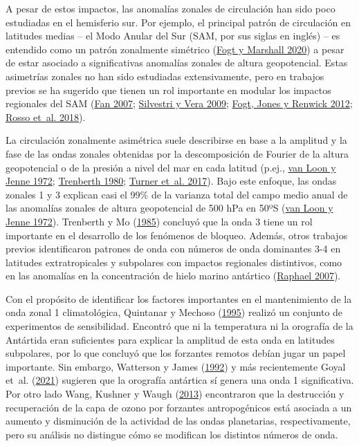 \documentclass[12pt,oneside,a4paper]{reedthesis}
\begin{document}
A pesar de estos impactos, las anomalías zonales de circulación han sido poco estudiadas en el hemisferio sur.
Por ejemplo, el principal patrón de circulación en latitudes medias -- el Modo Anular del Sur (SAM, por sus siglas en inglés) -- es entendido como un patrón zonalmente simétrico (\protect\hyperlink{ref-fogt2020}{Fogt y Marshall 2020}) a pesar de estar asociado a significativas anomalías zonales de altura geopotencial.
Estas asimetrías zonales no han sido estudiadas extensivamente, pero en trabajos previos se ha sugerido que tienen un rol importante en modular los impactos regionales del SAM (\protect\hyperlink{ref-fan2007}{Fan 2007}; \protect\hyperlink{ref-silvestri2009}{Silvestri y Vera 2009}; \protect\hyperlink{ref-fogt2012}{Fogt, Jones y Renwick 2012}; \protect\hyperlink{ref-rosso2018}{Rosso et~al. 2018}).

La circulación zonalmente asimétrica suele describirse en base a la amplitud y la fase de las ondas zonales obtenidas por la descomposición de Fourier de la altura geopotencial o de la presión a nivel del mar en cada latitud (p.ej., \protect\hyperlink{ref-vanloon1972}{van Loon y Jenne 1972}; \protect\hyperlink{ref-trenberth1980a}{Trenberth 1980}; \protect\hyperlink{ref-turner2017}{Turner et~al. 2017}).
Bajo este enfoque, las ondas zonales 1 y 3 explican casi el 99\% de la varianza total del campo medio anual de las anomalías zonales de altura geopotencial de 500 hPa en 50ºS (\protect\hyperlink{ref-vanloon1972}{van Loon y Jenne 1972}).
Trenberth y Mo (\protect\hyperlink{ref-trenberth1985}{1985}) concluyó que la onda 3 tiene un rol importante en el desarrollo de los fenómenos de bloqueo.
Además, otros trabajos previos identificaron patrones de onda con números de onda dominantes 3-4 en latitudes extratropicales y subpolares con impactos regionales distintivos, como en las anomalías en la concentración de hielo marino antártico (\protect\hyperlink{ref-raphael2007}{Raphael 2007}).

Con el propósito de identificar los factores importantes en el mantenimiento de la onda zonal 1 climatológica, Quintanar y Mechoso (\protect\hyperlink{ref-quintanar1995a}{1995}) realizó un conjunto de experimentos de sensibilidad.
Encontró que ni la temperatura ni la orografía de la Antártida eran suficientes para explicar la amplitud de esta onda en latitudes subpolares, por lo que concluyó que los forzantes remotos debían jugar un papel importante.
Sin embargo, Watterson y James (\protect\hyperlink{ref-watterson1992}{1992}) y más recientemente Goyal et~al. (\protect\hyperlink{ref-goyal2021a}{2021}) sugieren que la orografía antártica sí genera una onda 1 significativa.
Por otro lado Wang, Kushner y Waugh (\protect\hyperlink{ref-wang2013}{2013}) encontraron que la destrucción y recuperación de la capa de ozono por forzantes antropogénicos está asociada a un aumento y disminución de la actividad de las ondas planetarias, respectivamente, pero su análisis no distingue cómo se modifican los distintos números de onda.
\end{document}
